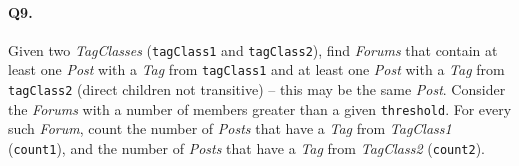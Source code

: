 \paragraph{Q9.}
Given two \emph{TagClasses} (\texttt{tagClass1} and \texttt{tagClass2}),
find \emph{Forums} that contain at least one \emph{Post} with a
\emph{Tag} from \texttt{tagClass1} and at least one \emph{Post} with a
\emph{Tag} from \texttt{tagClass2} (direct children not transitive) --
this may be the same \emph{Post}.
Consider the \emph{Forums} with a number of members greater than a given
\texttt{threshold}. For every such \emph{Forum}, count the number of
\emph{Posts} that have a \emph{Tag} from \emph{TagClass1}
(\texttt{count1}), and the number of \emph{Posts} that have a \emph{Tag}
from \emph{TagClass2} (\texttt{count2}).
